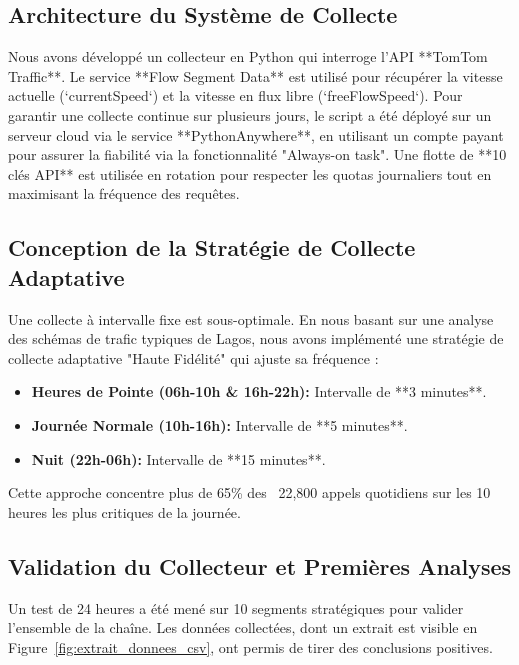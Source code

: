\subsection{Architecture du Système de Collecte}
\label{subsec:architecture_collecteur_dynamic}

Nous avons développé un collecteur en Python qui interroge l'API **TomTom Traffic**. Le service **Flow Segment Data** est utilisé pour récupérer la vitesse actuelle (`currentSpeed`) et la vitesse en flux libre (`freeFlowSpeed`). Pour garantir une collecte continue sur plusieurs jours, le script a été déployé sur un serveur cloud via le service **PythonAnywhere**, en utilisant un compte payant pour assurer la fiabilité via la fonctionnalité "Always-on task". Une flotte de **10 clés API** est utilisée en rotation pour respecter les quotas journaliers tout en maximisant la fréquence des requêtes.

\subsection{Conception de la Stratégie de Collecte Adaptative}
\label{subsec:strategie_adaptative_dynamic}

Une collecte à intervalle fixe est sous-optimale. En nous basant sur une analyse des schémas de trafic typiques de Lagos, nous avons implémenté une stratégie de collecte adaptative "Haute Fidélité" qui ajuste sa fréquence :
\begin{itemize}
    \item \textbf{Heures de Pointe (06h-10h \& 16h-22h):} Intervalle de **3 minutes**.
    \item \textbf{Journée Normale (10h-16h):} Intervalle de **5 minutes**.
    \item \textbf{Nuit (22h-06h):} Intervalle de **15 minutes**.
\end{itemize}
Cette approche concentre plus de 65\% des ~22,800 appels quotidiens sur les 10 heures les plus critiques de la journée.

\subsection{Validation du Collecteur et Premières Analyses}
\label{subsec:validation_collecteur_dynamic}

Un test de 24 heures a été mené sur 10 segments stratégiques pour valider l'ensemble de la chaîne. Les données collectées, dont un extrait est visible en Figure~\ref{fig:extrait_donnees_csv}, ont permis de tirer des conclusions positives.

